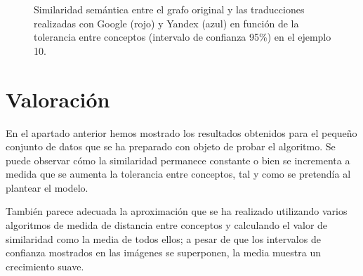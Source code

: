 \documentclass[a4paper,12pt,spanish]{book}
\begin{document}
\begin{figure}[htbp]
\centering
\capstart

\caption{Similaridad semántica entre el grafo original y las traducciones realizadas con Google (rojo) y Yandex (azul) en función de la tolerancia entre conceptos (intervalo de confianza 95\%) en el ejemplo 10.}\label{5.pruebas/index:sample10-relation-tol-0}\end{figure}


\section{Valoración}
\label{5.pruebas/index:valoracion}
En el apartado anterior hemos mostrado los resultados obtenidos para el pequeño conjunto
de datos que se ha preparado con objeto de probar el algoritmo. Se puede observar cómo
la similaridad permanece constante o bien se incrementa a medida que se aumenta la
tolerancia entre conceptos, tal y como se pretendía al plantear el modelo.

También parece adecuada la aproximación que se ha realizado utilizando varios algoritmos
de medida de distancia entre conceptos y calculando el valor de similaridad como la media
de todos ellos; a pesar de que los intervalos de confianza mostrados en las imágenes se
superponen, la media muestra un crecimiento suave.
\end{document}
